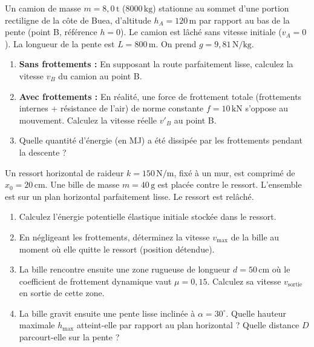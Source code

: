 \documentclass[11pt]{article}
\newcounter{popsec}
\newcounter{popsub}
\newcommand{\courssub}[1]{%
  \stepcounter{popsub}%
  \par\vspace{9pt}\noindent{\popxbold\fontsize{11.5}{13}\selectfont\color{popink}{\color{poporange}\thepopsec.\thepopsub}\hspace{6pt}#1}\par\nopagebreak\vspace{4pt}
}
\begin{document}
\courssub{Je m'entraîne}

\begin{exercice}
Un camion de masse $m = 8,0\,\text{t}$ ($8000\,\text{kg}$) stationne au sommet d'une portion rectiligne de la côte de Buea, d'altitude $h_A = 120\,\text{m}$ par rapport au bas de la pente (point B, référence $h=0$). Le camion est lâché sans vitesse initiale ($v_A = 0$). La longueur de la pente est $L = 800\,\text{m}$. On prend $g = 9,81\,\text{N/kg}$.
\begin{enumerate}
    \item \textbf{Sans frottements :} En supposant la route parfaitement lisse, calculez la vitesse $v_B$ du camion au point B.
    \item \textbf{Avec frottements :} En réalité, une force de frottement totale (frottements internes + résistance de l'air) de norme constante $f = 10\,\text{kN}$ s'oppose au mouvement. Calculez la vitesse réelle $v'_B$ au point B.
    \item Quelle quantité d'énergie (en MJ) a été dissipée par les frottements pendant la descente ?
\end{enumerate}
\end{exercice}

\begin{exercice}
Un ressort horizontal de raideur $k = 150\,\text{N/m}$, fixé à un mur, est comprimé de $x_0 = 20\,\text{cm}$. Une bille de masse $m = 40\,\text{g}$ est placée contre le ressort. L'ensemble est sur un plan horizontal parfaitement lisse. Le ressort est relâché.
\begin{enumerate}
    \item Calculez l'énergie potentielle élastique initiale stockée dans le ressort.
    \item En négligeant les frottements, déterminez la vitesse $v_{\text{max}}$ de la bille au moment où elle quitte le ressort (position détendue).
    \item La bille rencontre ensuite une zone rugueuse de longueur $d = 50\,\text{cm}$ où le coefficient de frottement dynamique vaut $\mu = 0,15$. Calculez sa vitesse $v_{\text{sortie}}$ en sortie de cette zone.
    \item La bille gravit ensuite une pente lisse inclinée à $\alpha = 30^\circ$. Quelle hauteur maximale $h_{\text{max}}$ atteint-elle par rapport au plan horizontal ? Quelle distance $D$ parcourt-elle sur la pente ?
\end{enumerate}
\end{exercice}
\end{document}
